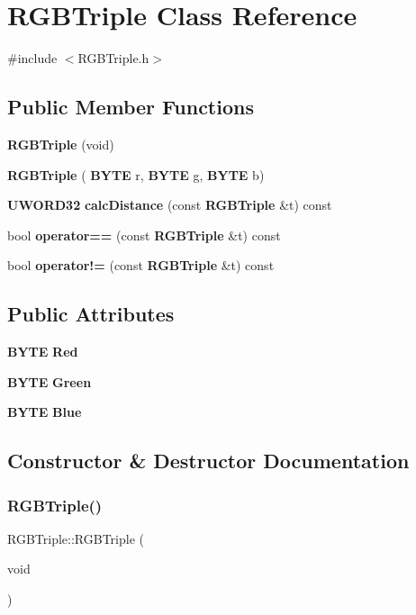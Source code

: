 \section{R\+G\+B\+Triple Class Reference}
\label{classRGBTriple}


{\ttfamily \#include $<$R\+G\+B\+Triple.\+h$>$}

\subsection*{Public Member Functions}
\begin{DoxyCompactItemize}
\item 
\textbf{ R\+G\+B\+Triple} (void)
\item 
\textbf{ R\+G\+B\+Triple} (\textbf{ B\+Y\+TE} r, \textbf{ B\+Y\+TE} g, \textbf{ B\+Y\+TE} b)
\item 
\textbf{ U\+W\+O\+R\+D32} \textbf{ calc\+Distance} (const \textbf{ R\+G\+B\+Triple} \&t) const
\item 
bool \textbf{ operator==} (const \textbf{ R\+G\+B\+Triple} \&t) const
\item 
bool \textbf{ operator!=} (const \textbf{ R\+G\+B\+Triple} \&t) const
\end{DoxyCompactItemize}
\subsection*{Public Attributes}
\begin{DoxyCompactItemize}
\item 
\textbf{ B\+Y\+TE} \textbf{ Red}
\item 
\textbf{ B\+Y\+TE} \textbf{ Green}
\item 
\textbf{ B\+Y\+TE} \textbf{ Blue}
\end{DoxyCompactItemize}


\subsection{Constructor \& Destructor Documentation}
\mbox{\label{classRGBTriple_aab572f447086df43db5d08b4c3b75199}} 
\subsubsection{R\+G\+B\+Triple()\hspace{0.1cm}{\footnotesize\ttfamily [1/2]}}
{\footnotesize\ttfamily R\+G\+B\+Triple\+::\+R\+G\+B\+Triple (\begin{DoxyParamCaption}\item[{void}]{ }\end{DoxyParamCaption})\hspace{0.3cm}{\ttfamily [inline]}}

